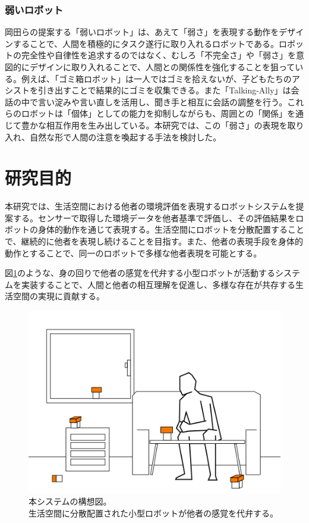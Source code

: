 \documentclass{cuxarticle}
\begin{document}
\subsubsection{弱いロボット}
岡田らの提案する「弱いロボット」\cite{岡田-2017-弱いロボ}は、あえて「弱さ」を表現する動作をデザインすることで、人間を積極的にタスク遂行に取り入れるロボットである。ロボットの完全性や自律性を追求するのではなく、むしろ「不完全さ」や「弱さ」を意図的にデザインに取り入れることで、人間との関係性を強化することを狙っている。例えば、「ゴミ箱ロボット」\cite{岡田美智男-2012-ゴミ箱ロ}は一人ではゴミを拾えないが、子どもたちのアシストを引き出すことで結果的にゴミを収集できる。また「Talking-Ally」\cite{岡田美智男-2012-ゴミ箱ロ}は会話の中で言い淀みや言い直しを活用し、聞き手と相互に会話の調整を行う。これらのロボットは「個体」としての能力を抑制しながらも、周囲との「関係」を通じて豊かな相互作用を生み出している。本研究では、この「弱さ」の表現を取り入れ、自然な形で人間の注意を喚起する手法を検討した。

\section{研究目的}
本研究では、生活空間における他者の環境評価を表現するロボットシステムを提案する。センサーで取得した環境データを他者基準で評価し、その評価結果をロボットの身体的動作を通じて表現する。生活空間にロボットを分散配置することで、継続的に他者を表現し続けることを目指す。また、他者の表現手段を身体的動作とすることで、同一のロボットで多様な他者表現を可能とする。

図\ref{fig:system-concept}のような、身の回りで他者の感覚を代弁する小型ロボットが活動するシステムを実装することで、人間と他者の相互理解を促進し、多様な存在が共存する生活空間の実現に貢献する。

\begin{figure}[h]
  \centering
  \includegraphics[keepaspectratio,height=0.2\textheight]{resources/robot-in-house.png}
  \caption[short]{本システムの構想図。\\生活空間に分散配置された小型ロボットが他者の感覚を代弁する。}
  \label{fig:system-concept}
\end{figure}
\end{document}

